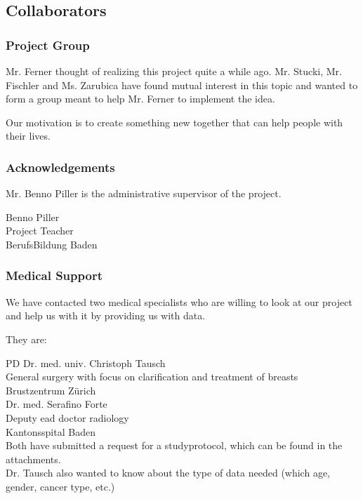 \subsection{Collaborators}
\subsubsection{Project Group}
Mr. Ferner thought of realizing this project quite a while ago.
Mr. Stucki, Mr. Fischler and Ms. Zarubica have found mutual interest in this topic and wanted to form a group meant to help Mr. Ferner to implement the idea.

Our motivation is to create something new together that can help people with their lives. 

\subsubsection{Acknowledgements}
Mr. Benno Piller is the administrative supervisor of the project.

Benno Piller\\
Project Teacher\\
BerufsBildung Baden

\subsubsection{Medical Support}

We have contacted two medical specialists who are willing to look at our project and help us with it by providing us with data.

They are:

PD Dr. med. univ. Christoph Tausch\\
General surgery with focus on clarification and treatment of breasts\\
Brustzentrum Zürich\\


Dr. med. Serafino Forte\\
Deputy ead doctor radiology\\
Kantonsspital Baden\\

Both have submitted a request for a studyprotocol, which can be found in the attachments. \\
Dr. Tausch also wanted to know about the type of data needed (which age, gender, cancer type, etc.)